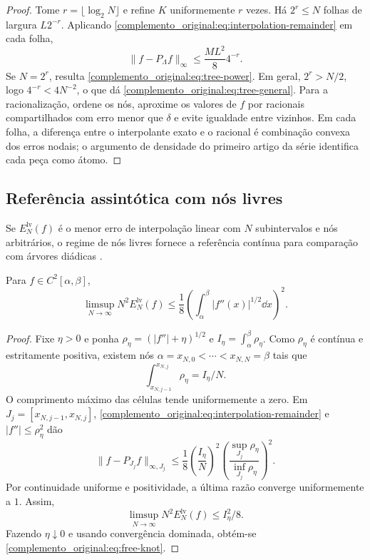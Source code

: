 \begin{proof}
Tome $r=\lfloor\log_2N\rfloor$ e refine $K$ uniformemente $r$ vezes. Há $2^r\le N$ folhas de largura $L2^{-r}$. Aplicando \eqref{complemento_original:eq:interpolation-remainder} em cada folha,
\[
 \|f-P_\Lambda f\|_\infty\le\frac{ML^2}{8}4^{-r}.
\]
Se $N=2^r$, resulta \eqref{complemento_original:eq:tree-power}. Em geral, $2^r>N/2$, logo $4^{-r}<4N^{-2}$, o que dá \eqref{complemento_original:eq:tree-general}. Para a racionalização, ordene os nós, aproxime os valores de $f$ por racionais compartilhados com erro menor que $\delta$ e evite igualdade entre vizinhos. Em cada folha, a diferença entre o interpolante exato e o racional é combinação convexa dos erros nodais; o argumento de densidade do primeiro artigo da série identifica cada peça como átomo.
\end{proof}

\subsection{Referência assintótica com nós livres}

Se $E_N^{\mathrm{lv}}(f)$ é o menor erro de interpolação linear com $N$
subintervalos e nós arbitrários, o regime de nós livres fornece a referência
contínua para comparação com árvores diádicas
\citep{artigo_1-deboor1973,artigo_1-burchard1974,artigo_1-deboor2001,artigo_1-powell1981,artigo_1-schumaker2007}.

\begin{theorem}\label{map:complemento_original:6.2}\label{complemento_original:thm:free-knots}
Para $f\in C^2[\alpha,\beta]$,
\begin{equation}
 \limsup_{N\to\infty}N^2E_N^{\mathrm{lv}}(f)
 \le\frac18\left(\int_\alpha^\beta |f''(x)|^{1/2}\dd x\right)^2.
 \label{complemento_original:eq:free-knot}
\end{equation}
\end{theorem}

\begin{proof}
Fixe $\eta>0$ e ponha $\rho_\eta=(|f''|+\eta)^{1/2}$ e $I_\eta=\int_\alpha^\beta\rho_\eta$. Como $\rho_\eta$ é contínua e estritamente positiva, existem nós $\alpha=x_{N,0}<\cdots<x_{N,N}=\beta$ tais que
\[
 \int_{x_{N,j-1}}^{x_{N,j}}\rho_\eta=I_\eta/N.
\]
O comprimento máximo das células tende uniformemente a zero. Em $J_j=[x_{N,j-1},x_{N,j}]$, \eqref{complemento_original:eq:interpolation-remainder} e $|f''|\le\rho_\eta^2$ dão
\[
 \|f-P_{J_j}f\|_{\infty,J_j}
 \le\frac18\left(\frac{I_\eta}{N}\right)^2
 \left(\frac{\sup_{J_j}\rho_\eta}{\inf_{J_j}\rho_\eta}\right)^2.
\]
Por continuidade uniforme e positividade, a última razão converge uniformemente a $1$. Assim,
\[
 \limsup_{N\to\infty}N^2E_N^{\mathrm{lv}}(f)\le I_\eta^2/8.
\]
Fazendo $\eta\downarrow0$ e usando convergência dominada, obtém-se \eqref{complemento_original:eq:free-knot}.
\end{proof}


